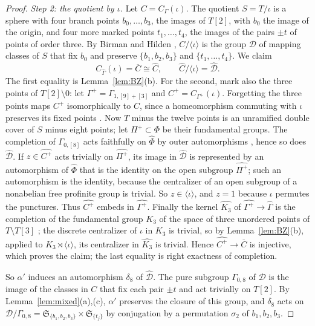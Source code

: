 \documentclass[11pt,a4paper]{article}
\theoremstyle{plain}
\theoremstyle{definition}
\theoremstyle{remark}
\begin{document}
\begin{proof}
\emph{Step 2: the quotient by $\iota$.} Let $C=C_\Gamma(\iota)$. The quotient $S=T/\iota$ is a sphere with four
branch points $b_0,\dots,b_3$, the images of $T[2]$, with $b_0$ the image of the origin, and four more marked
points $t_1,\dots,t_4$, the images of the pairs $\pm t$ of points of order three. By Birman and Hilden \cite{BH},
$C/\langle\iota\rangle$ is the group $\mathcal D$ of mapping classes of $S$ that fix $b_0$ and preserve
$\{b_1,b_2,b_3\}$ and $\{t_1,\dots,t_4\}$. We claim
\[
 C_{\widehat\Gamma}(\iota)=\overline C\cong\widehat C,\qquad \widehat C/\langle\iota\rangle=\widehat{\mathcal D}.
\]
The first equality is Lemma~\ref{lem:BZ}(b). For the second, mark also the three points of
$T[2]\setminus0$: let $\Gamma^+=\Gamma_{1,[9]+[3]}$ and $C^+=C_{\Gamma^+}(\iota)$. Forgetting the three points
maps $C^+$ isomorphically to $C$, since a homeomorphism commuting with $\iota$ preserves its fixed points
\cite{BH}. Now
$T$ minus the twelve points is an unramified double cover of $S$ minus eight points; let $\Pi^+\subset\Phi$ be
their fundamental groups. The completion of $\Gamma_{0,[8]}$ acts faithfully on $\widehat\Phi$ by outer
automorphisms \cite{As}, hence so does $\widehat{\mathcal D}$. If $z\in\widehat{C^+}$ acts trivially on
$\widehat{\Pi^+}$, its image in $\widehat{\mathcal D}$ is represented by an automorphism of $\widehat\Phi$ that is
the identity on the open subgroup $\widehat{\Pi^+}$; such an automorphism is the identity, because the centralizer
of an open subgroup of a nonabelian free profinite group is trivial. So $z\in\langle\iota\rangle$, and $z=1$
because $\iota$ permutes the punctures. Thus $\widehat{C^+}$ embeds in $\widehat{\Gamma^+}$. Finally the kernel
$\widehat{K_3}$ of $\widehat{\Gamma^+}\to\widehat\Gamma$ is the completion of the fundamental group $K_3$ of the
space of three unordered points of $T\setminus T[3]$ \cite{A}; the discrete centralizer of $\iota$ in $K_3$ is
trivial, so by Lemma~\ref{lem:BZ}(b), applied to $K_3\rtimes\langle\iota\rangle$, its centralizer in
$\widehat{K_3}$ is trivial. Hence $\widehat{C^+}\to\overline C$ is injective, which proves the claim; the last
equality is right exactness of completion.

So $\alpha'$ induces an automorphism $\delta_8$ of $\widehat{\mathcal D}$. The pure subgroup $\Gamma_{0,8}$ of
$\mathcal D$ is the image of the classes in $C$ that fix each pair $\pm t$ and act trivially on $T[2]$. By
Lemma~\ref{lem:mixed}(a),(c), $\alpha'$ preserves the closure of this group, and $\delta_8$ acts on
$\mathcal D/\Gamma_{0,8}=\mathfrak S_{\{b_1,b_2,b_3\}}\times\mathfrak S_{\{t_j\}}$ by conjugation by a permutation
$\sigma_2$ of $b_1,b_2,b_3$.


\end{proof}
\end{document}
